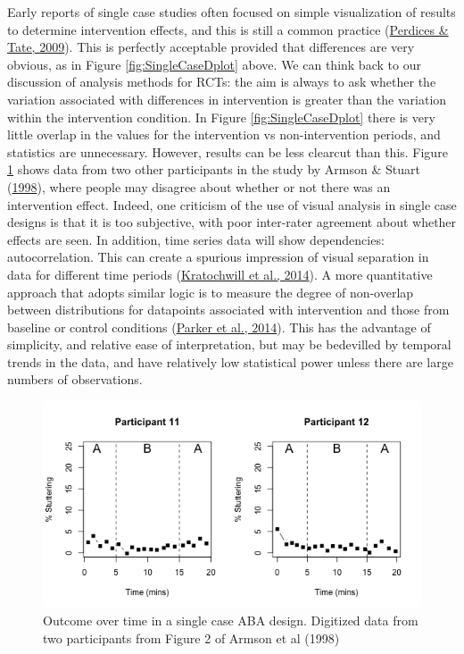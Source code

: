 \documentclass{krantz}
\begin{document}
Early reports of single case studies often focused on simple visualization of results to determine intervention effects, and this is still a common practice (\protect\hyperlink{ref-perdices2009}{Perdices \& Tate, 2009}). This is perfectly acceptable provided that differences are very obvious, as in Figure \ref{fig:SingleCaseDplot} above. We can think back to our discussion of analysis methods for RCTs: the aim is always to ask whether the variation associated with differences in intervention is greater than the variation within the intervention condition. In Figure \ref{fig:SingleCaseDplot} there is very little overlap in the values for the intervention vs non-intervention periods, and statistics are unnecessary. However, results can be less clearcut than this. Figure \ref{fig:SingleCaseDplot2} shows data from two other participants in the study by Armson \& Stuart (\protect\hyperlink{ref-armson1998}{1998}), where people may disagree about whether or not there was an intervention effect. Indeed, one criticism of the use of visual analysis in single case designs is that it is too subjective, with poor inter-rater agreement about whether effects are seen. In addition, time series data will show dependencies: autocorrelation. This can create a spurious impression of visual separation in data for different time periods (\protect\hyperlink{ref-kratochwill2014b}{Kratochwill et al., 2014}). A more quantitative approach that adopts similar logic is to measure the degree of non-overlap between distributions for datapoints associated with intervention and those from baseline or control conditions (\protect\hyperlink{ref-parker2014}{Parker et al., 2014}). This has the advantage of simplicity, and relative ease of interpretation, but may be bedevilled by temporal trends in the data, and have relatively low statistical power unless there are large numbers of observations.

\begin{figure}
\includegraphics[width=0.85\linewidth]{images_bw/SingleCaseDplot2} \caption{Outcome over time in a single case ABA design. Digitized data from two participants from Figure 2 of Armson et al (1998)}\label{fig:SingleCaseDplot2}
\end{figure}
\end{document}
